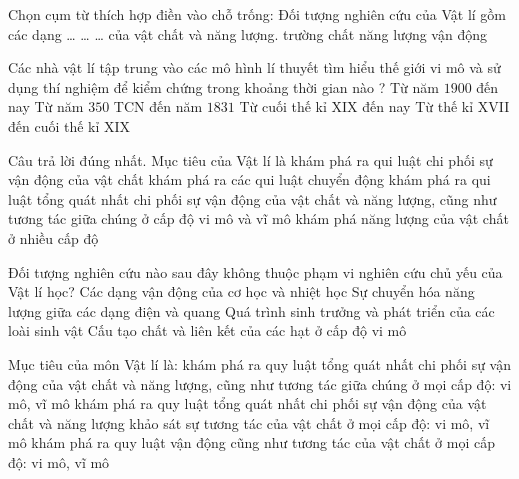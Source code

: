 \begin{ex}
Chọn cụm từ thích hợp điền vào chỗ trống: Đối tượng nghiên cứu của Vật lí gồm các dạng … … … của vật chất và năng lượng.
\choice
{trường}
{chất}
{năng lượng}
{\True vận động}
\end{ex}

\begin{ex}
Các nhà vật lí tập trung vào các mô hình lí thuyết tìm hiểu thế giới vi mô và sử dụng thí nghiệm để kiểm chứng trong khoảng thời gian nào ?
\choice
{Từ năm $1900$ đến nay}
{Từ năm $350$ TCN đến năm $1831$}
{\True Từ cuối thế kỉ XIX đến nay}
{Từ thế kỉ XVII đến cuối thế kỉ XIX}
\end{ex}

\begin{ex}
Câu trả lời đúng nhất. Mục tiêu của Vật lí là
\choice
{khám phá ra qui luật chi phối sự vận động của vật chất}
{khám phá ra các qui luật chuyển động}
{\True khám phá ra qui luật tổng quát nhất chi phối sự vận động của vật chất và năng lượng, cũng như tương tác giữa chúng ở cấp độ vi mô và vĩ mô}
{khám phá năng lượng của vật chất ở nhiều cấp độ}
\end{ex}

\begin{ex}
Đối tượng nghiên cứu nào sau đây không thuộc phạm vi nghiên cứu chủ yếu của Vật lí học?
\choice
{Các dạng vận động của cơ học và nhiệt học}
{Sự chuyển hóa năng lượng giữa các dạng điện và quang}
{\True Quá trình sinh trưởng và phát triển của các loài sinh vật}
{Cấu tạo chất và liên kết của các hạt ở cấp độ vi mô}
\end{ex}

\begin{ex}
Mục tiêu của môn Vật lí là:
\choice
{\True khám phá ra quy luật tổng quát nhất chi phối sự vận động của vật chất và năng lượng, cũng như tương tác giữa chúng ở mọi cấp độ: vi mô, vĩ mô}
{khám phá ra quy luật tổng quát nhất chi phối sự vận động của vật chất và năng lượng}
{khảo sát sự tương tác của vật chất ở mọi cấp độ: vi mô, vĩ mô}
{khám phá ra quy luật vận động cũng như tương tác của vật chất ở mọi cấp độ: vi mô, vĩ mô}
\end{ex}

